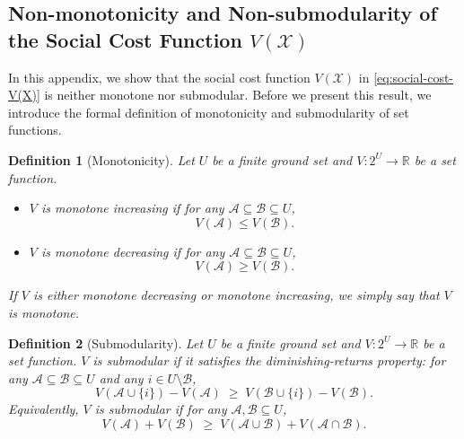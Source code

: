 \documentclass[lettersize,journal]{IEEEtran}
\newtheorem{definition}{Definition}
\begin{document}
\subsection{Non-monotonicity and Non-submodularity of the Social Cost Function $V(\mathcal{X})$}\label{proof:non-submodular-non-monotone}
In this appendix, we show that the social cost function $V(\mathcal{X})$ in \eqref{eq:social-cost-V(X)} is neither monotone nor submodular. Before we present this result, we introduce the formal definition of monotonicity and submodularity of set functions.
\begin{definition}[Monotonicity]\label{def:monotonicity}
Let $U$ be a finite ground set and $V:2^U\rightarrow\mathbb{R}$ be a set function.
\begin{itemize}
    \item $V$ is \emph{monotone increasing} if for any $\mathcal{A}\subseteq \mathcal{B}\subseteq U$,
    \begin{equation}\label{eq:mono_inc}
        V(\mathcal{A}) \le V(\mathcal{B}).
    \end{equation}
    \item $V$ is \emph{monotone decreasing} if for any $\mathcal{A}\subseteq \mathcal{B}\subseteq U$,
    \begin{equation}\label{eq:mono_dec}
        V(\mathcal{A}) \ge V(\mathcal{B}).
    \end{equation}
\end{itemize}
If $V$ is either monotone decreasing or monotone increasing, we simply say that $V$ is \emph{monotone}.
\end{definition}

\begin{definition}[Submodularity]\label{def:submodularity}
Let $U$ be a finite ground set and $V:2^U\rightarrow\mathbb{R}$ be a set function.
$V$ is \emph{submodular} if it satisfies the diminishing-returns property: for any $\mathcal{A}\subseteq \mathcal{B}\subseteq U$ and any $i\in U\setminus \mathcal{B}$,
\begin{equation}\label{eq:submod_def}
    V(\mathcal{A}\cup\{i\}) - V(\mathcal{A})
    \;\ge\;
    V(\mathcal{B}\cup\{i\}) - V(\mathcal{B}).
\end{equation}
Equivalently, $V$ is submodular if for any $\mathcal{A},\mathcal{B}\subseteq U$,
\begin{equation}\label{eq:submod_equiv}
    V(\mathcal{A}) + V(\mathcal{B})
    \;\ge\;
    V(\mathcal{A}\cup \mathcal{B}) + V(\mathcal{A}\cap \mathcal{B}).
\end{equation}
\end{definition}
\end{document}
